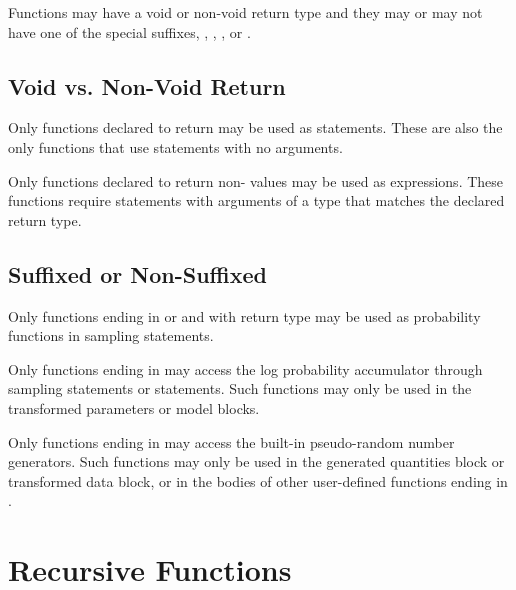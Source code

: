 Functions may have a void or non-void return type and they may or may
not have one of the special suffixes, , ,
, or .

\subsection{Void vs. Non-Void Return}

Only functions declared to return  may be used as
statements.  These are also the only functions that use 
statements with no arguments.

Only functions declared to return non- values may be used
as expressions.  These functions require  statements with
arguments of a type that matches the declared return type.

\subsection{Suffixed or Non-Suffixed}

Only functions ending in  or  and with
return type  may be used as probability functions in
sampling statements.

Only functions ending in  may access the log probability
accumulator through sampling statements or 
statements.  Such functions may only be used in the transformed
parameters or model blocks.

Only functions ending in  may access the built-in
pseudo-random number generators.  Such functions may only be used in
the generated quantities block or transformed data block, or in the
bodies of other user-defined functions ending in .


\section{Recursive Functions}

